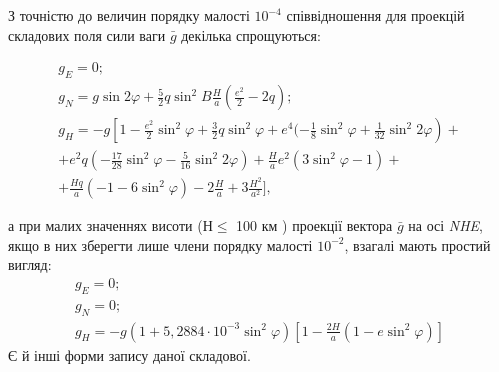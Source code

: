 З точністю до величин порядку малості $10^{-4}$ співвідношення для проекцій складових 
поля сили ваги $\bar{g}$ декілька спрощуються:

\[\begin{array}{l} 
{ g_{E} =0;} \\ 
{g_{N} =g\sin 2\varphi+\frac{5}{2} q\sin ^{2} B\frac{H}{a}(\frac{e^{2} }{2} -2q);} \\ 
{g_{H} =-g\left[1-\frac{e^{2} }{2}\sin ^{2} \varphi+\frac{3}{2} q\sin ^{2} \varphi+e^{4}(-\frac{1}{8} \sin ^{2} \varphi+\frac{1}{32} 
\sin ^{2} 2\varphi\right)+} \\ 
{ +e^{2} q\left(-\frac{17}{28} 
\sin ^{2} \varphi-\frac{5}{16} \sin ^{2} 2\varphi\right)+\frac{H}{a} e^{2} (3\sin ^{2} \varphi-1)+}\\ 
{ +\frac{Hq}{a} (-1-6\sin ^{2}\varphi)-2\frac{H}{a} +3\frac{H^{2} }{a^{2} }],} 
\end{array}\] 

а при малих значеннях висоти ($Н\leq$ 100 км ) проекції вектора  $\bar{g}$ на 
осі \textit{NHE}, якщо в них зберегти лише члени порядку малості $10^{-2}$, 
взагалі мають простий вигляд: 
\[\begin{array}{l} 
{g_{E} =0;}\\
{g_{N} =0;}\\ 
{g_{H} =-g(1+5,2884\cdot 10^{-3} \sin ^{2}\varphi)[1-\frac{2H}{a}
(1-e\sin^{2}\varphi )]} 
\end{array}\] 
Є й інші форми запису даної складової.

